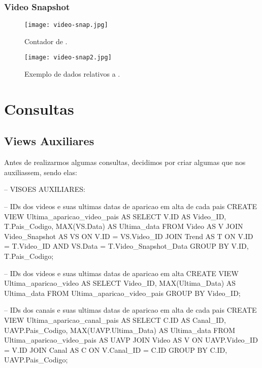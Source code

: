 \subsubsection{Video Snapshot}

  \begin{figure}[H]
    \centering
    \texttt{[image: video-snap.jpg]}
    \caption{Contador de .}
  \end{figure}

  \begin{figure}[H]
    \centering
    \texttt{[image: video-snap2.jpg]}
    \caption{Exemplo de dados relativos a .}
  \end{figure}
  \section{Consultas}

\subsection{Views Auxiliares}

  Antes de realizarmos algumas consultas, decidimos por criar algumas  que nos auxiliassem, sendo elas:

  \begin{code}
-- VISOES AUXILIARES:

-- IDs dos videos e suas ultimas datas de aparicao em alta de cada pais
CREATE VIEW Ultima_aparicao_video_pais AS
SELECT V.ID AS Video_ID, T.Pais_Codigo, MAX(VS.Data) AS Ultima_data
FROM Video AS V JOIN
    Video_Snapshot AS VS ON V.ID = VS.Video_ID JOIN
      Trend AS T ON V.ID = T.Video_ID AND
              VS.Data = T.Video_Snapshot_Data
GROUP BY V.ID, T.Pais_Codigo;

-- IDs dos videos e suas ultimas datas de aparicao em alta
CREATE VIEW Ultima_aparicao_video AS
SELECT Video_ID, MAX(Ultima_Data) AS Ultima_data
FROM Ultima_aparicao_video_pais
GROUP BY Video_ID;

-- IDs dos canais e suas ultimas datas de aparicao em alta de cada pais
CREATE VIEW Ultima_aparicao_canal_pais AS
SELECT C.ID AS Canal_ID, UAVP.Pais_Codigo, MAX(UAVP.Ultima_Data) AS Ultima_data
FROM Ultima_aparicao_video_pais AS UAVP JOIN
    Video AS V ON UAVP.Video_ID = V.ID JOIN
      Canal AS C ON V.Canal_ID = C.ID
GROUP BY C.ID, UAVP.Pais_Codigo;
  \end{code}

